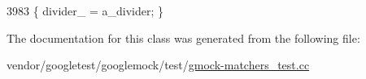 \begin{DoxyCode}
3983 \{ divider\_ = a\_divider; \}
\end{DoxyCode}


The documentation for this class was generated from the following file\+:\begin{DoxyCompactItemize}
\item 
vendor/googletest/googlemock/test/\hyperlink{gmock-matchers__test_8cc}{gmock-\/matchers\+\_\+test.\+cc}\end{DoxyCompactItemize}
